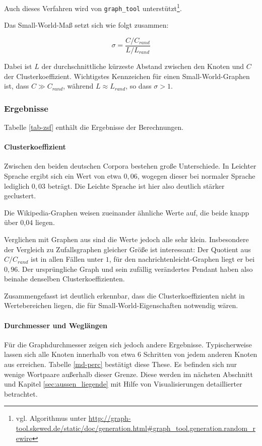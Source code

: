 \documentclass[11pt, a4paper]{article}
\begin{document}
Auch dieses Verfahren wird von \texttt{graph\_tool} unterstützt\footnote{vgl. Algorithmus unter \url{http://graph-tool.skewed.de/static/doc/generation.html\#graph_tool.generation.random_rewire}}.

Das Small-World-Maß setzt sich wie folgt zusammen:

$$
\sigma = \frac{C/C_{rand}}{ L/L_{rand}}
$$

Dabei ist $L$ der durchschnittliche kürzeste Abstand zwischen den Knoten und $C$
der Clusterkoeffizient.
Wichtigstes Kennzeichen für einen Small-World-Graphen ist,
dass $C \gg C_{rand}$, während $L \approx L_{rand}$, so dass $\sigma > 1$.\cite{Humphries2006}

\subsubsection{Ergebnisse}
Tabelle \ref{tab-zsf} enthält die Ergebnisse der Berechnungen.

\paragraph{Clusterkoeffizient}
Zwischen den beiden deutschen Corpora bestehen große Unterschiede.
In Leichter Sprache ergibt sich ein Wert von etwa $0,06$, wogegen dieser bei normaler Sprache lediglich $0,03$ beträgt.
Die Leichte Sprache ist hier also deutlich stärker geclustert.

Die Wikipedia-Graphen weisen zueinander ähnliche Werte auf, die beide knapp über 0,04 liegen.

Verglichen mit Graphen aus \cite{Newman2003} sind die Werte jedoch alle sehr klein.
Insbesondere der Vergleich zu Zufallsgraphen gleicher Größe ist interessant:
Der Quotient aus $C/C_{rand}$ ist in allen Fällen unter $1$, für den nachrichtenleicht-Graphen liegt er bei $0,96$.
Der ursprüngliche Graph und sein zufällig verändertes Pendant haben also beinahe denselben Clusterkoeffizienten.

Zusammengefasst ist deutlich erkennbar, dass die Clusterkoeffizienten nicht in Wertebereichen liegen, die für Small-World-Eigenschaften notwendig wären.

\paragraph{Durchmesser und Weglängen}
Für die Graphdurchmesser zeigen sich jedoch andere Ergebnisse.
Typischerweise lassen sich alle Knoten innerhalb von etwa 6 Schritten von jedem anderen Knoten aus erreichen.
Tabelle \ref{md-perc} bestätigt diese These.
Es befinden sich nur wenige Wortpaare außerhalb dieser Grenze.
Diese werden im nächsten Abschnitt und Kapitel \ref{sec:aussen_liegende} mit Hilfe von Visualisierungen detaillierter betrachtet.
\end{document}
